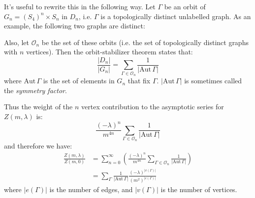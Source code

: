 \documentclass{jknotes}
\begin{document}
It's useful to rewrite this in the following way. Let \(\Gamma\) be an orbit of \(G_n=(S_4)^n\times S_n\) in \(D_n\), i.e. \(\Gamma\) is a topologically distinct unlabelled graph. As an example, the following two graphs are distinct:
\begin{figure}[H]
    \centering
\end{figure}
Also, let \(\mathcal{O}_n\) be the set of these orbits (i.e. the set of topologically distinct graphs with \(n\) vertices). Then the orbit-stabilizer theorem states that:
\begin{equation}
    \frac{|D_n|}{|G_n|} = \sum_{\Gamma\in\mathcal{O}_n}\frac{1}{|\text{Aut}\,\Gamma|}
\end{equation}
where \(\text{Aut}\,\Gamma\) is the set of elements in \(G_n\) that fix \(\Gamma\). \(|\text{Aut}\,\Gamma|\) is sometimes called the \emph{symmetry factor}.

Thus the weight of the \(n\) vertex contribution to the asymptotic series for \(Z(m,\lambda)\) is:
\begin{equation}
    \frac{(-\lambda)^n}{m^{4n}}\sum_{\Gamma\in\mathcal{O}_n}\frac{1}{|\text{Aut}\,\Gamma|}
\end{equation}
and therefore we have:
\begin{align}
    \frac{Z(m,\lambda)}{Z(m,0)} &= \sum_{n=0}^\infty \left( \frac{(-\lambda)^n}{m^{4n}}\sum_{\Gamma\in\mathcal{O}_n}\frac{1}{|\text{Aut}\,\Gamma|} \right) \\
    &= \sum_\Gamma \frac{1}{|\text{Aut}\,\Gamma|} \frac{(-\lambda)^{|v(\Gamma)|}}{(m^2)^{|e(\Gamma)|}}
\end{align}
where \(|e(\Gamma)|\) is the number of edges, and \(|v(\Gamma)|\) is the number of vertices.
\end{document}
